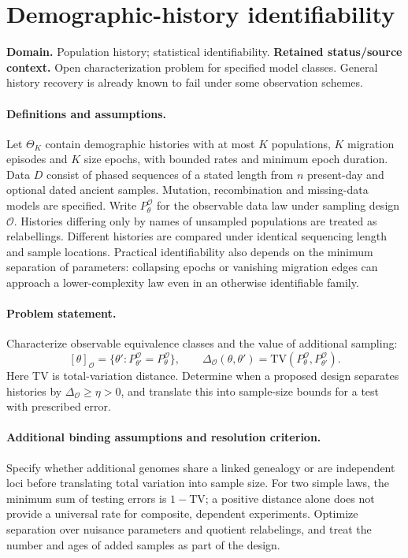 \documentclass[11pt]{article}
\begin{document}
\section*{Demographic-history identifiability}
\label{prob:162}
\label{rank:278}
\par\smallskip

\noindent\textbf{Domain.} Population history; statistical identifiability. \quad \textbf{Retained status/source context.} Open characterization problem for specified model classes. General history recovery is already known to fail under some observation schemes.
\paragraph{Definitions and assumptions.} Let $\Theta_K$ contain demographic histories with at most $K$ populations, $K$ migration episodes and $K$ size epochs, with bounded rates and minimum epoch duration. Data $D$ consist of phased sequences of a stated length from $n$ present-day and optional dated ancient samples. Mutation, recombination and missing-data models are specified. Write $P_\theta^\mathcal O$ for the observable data law under sampling design $\mathcal O$. Histories differing only by names of unsampled populations are treated as relabellings. Different histories are compared under identical sequencing length and sample locations. Practical identifiability also depends on the minimum separation of parameters: collapsing epochs or vanishing migration edges can approach a lower-complexity law even in an otherwise identifiable family.
\paragraph{Problem statement.} Characterize observable equivalence classes and the value of additional sampling:
\[
 [\theta]_{\mathcal O}=\{\theta':P_{\theta'}^\mathcal O=P_\theta^\mathcal O\},
 \qquad
 \Delta_{\mathcal O}(\theta,\theta')=
 \mathrm{TV}(P_\theta^\mathcal O,P_{\theta'}^\mathcal O).
\]
Here $\mathrm{TV}$ is total-variation distance. Determine when a proposed design separates histories by $\Delta_{\mathcal O}\ge\eta>0$, and translate this into sample-size bounds for a test with prescribed error.
\paragraph{Additional binding assumptions and resolution criterion.} Specify whether additional genomes share a linked genealogy or are independent loci before translating total variation into sample size. For two simple laws, the minimum sum of testing errors is $1-\mathrm{TV}$; a positive distance alone does not provide a universal rate for composite, dependent experiments. Optimize separation over nuisance parameters and quotient relabelings, and treat the number and ages of added samples as part of the design.
\end{document}
